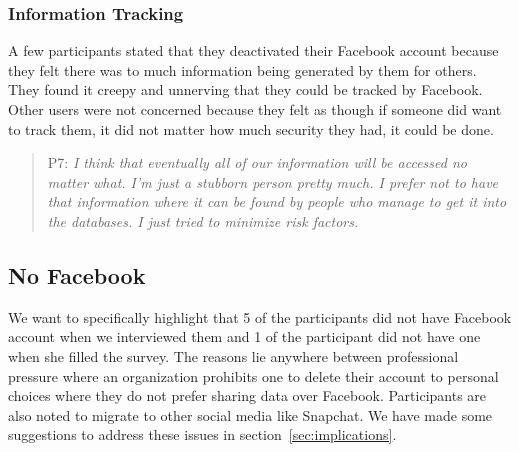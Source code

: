 \subsubsection{Information Tracking}
A few participants stated that they deactivated their Facebook account because they felt there was to much information being generated by them for others. They found it creepy and unnerving that they could be tracked by Facebook. Other users were not concerned because they felt as though if someone did want to track them, it did not matter how much security they had, it could be done. 
\begin{quote}
P7: \textit{I think that eventually all of our information will be accessed no matter what. I'm just a stubborn person pretty much. I prefer not to have that information where it can be found by people who manage to get it into the databases.  I just tried to minimize risk factors.}
\end{quote}
\subsection{No Facebook}
We want to specifically highlight that 5 of the participants did not have Facebook account when we interviewed them and 1 of the participant did not have one when she filled the survey. The reasons lie anywhere between professional pressure where an organization prohibits one to delete their account to personal choices where they do not prefer sharing data over Facebook. Participants are also noted to migrate to other social media like Snapchat. We have made some suggestions to address these issues in section~\ref{sec:implications}.

